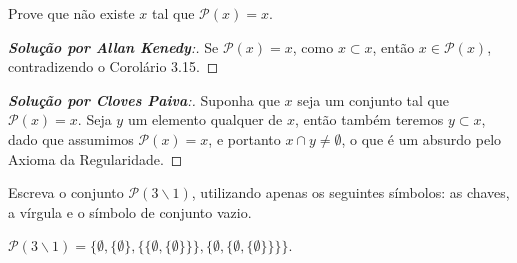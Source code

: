 \begin{exercicio}
	Prove que não existe $x$ tal que $\mathcal{P}(x)=x$.
\end{exercicio}
\begin{proof}[\textbf{Solução por Allan Kenedy}:]
	Se $\mathcal{P}(x)=x$, como $x\subset x$, então $x\in \mathcal{P}(x)$, contradizendo o Corolário 3.15.
\end{proof}
\begin{proof}[\textbf{Solução por Cloves Paiva}:]
	Suponha que $x$ seja um conjunto tal que $\mathcal{P}(x)=x$. Seja $y$ um elemento qualquer de $x$, então também teremos $y \subset x$, dado que assumimos $\mathcal{P}(x)=x$, e portanto $x \cap y \neq \emptyset$, o que é um absurdo pelo Axioma da Regularidade.
\end{proof}

\begin{exercicio}
	Escreva o conjunto $\mathcal{P}(3\backslash 1)$, utilizando apenas os seguintes símbolos: as chaves, a vírgula e o símbolo de conjunto vazio.
\end{exercicio}
\begin{solucao}
	$\mathcal{P}(3\backslash 1)=\{\emptyset,\{\emptyset\},\{\{\emptyset,\{\emptyset\}\}\},\{\emptyset,\{\emptyset,\{\emptyset\}\}\}\}$.
\end{solucao}

